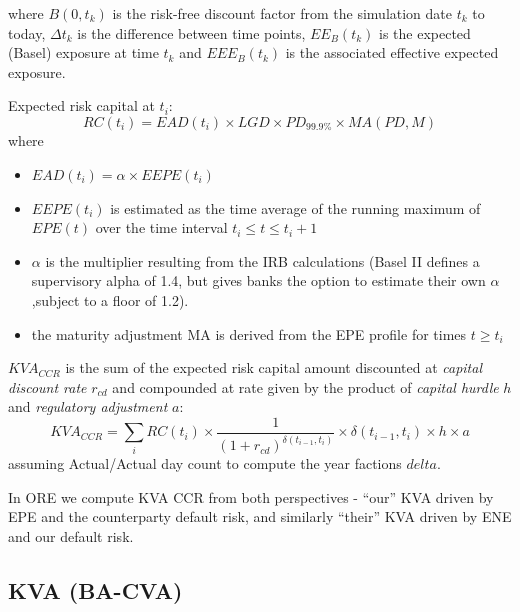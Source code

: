 \documentclass[12pt, a4paper]{article}
\newcommand{\KVA}{\mathit{KVA}}
\newcommand{\EE}{\mathit{EE}}
\newcommand{\EPE}{\mathit{EPE}}
\newcommand{\EEPE}{\mathit{EEPE}}
\newcommand{\EEE}{\mathit{EEE}}
\newcommand{\EAD}{\mathit{EAD}}
\newcommand{\RC}{\mathit{RC}}
\newcommand{\PD}{\mathit{PD}}
\newcommand{\MA}{\mathit{MA}}
\begin{document}
{{\begin{appendix}
\medskip where $B(0,t_k)$ is the risk-free discount factor from the
simulation  date $t_k$ to today, $\Delta t_k$ is the difference
between time points, 
$\EE_B(t_k)$ is the expected (Basel) exposure at time $t_k$ and $\EEE_B(t_k)$ is the
associated effective expected exposure.

\medskip 
Expected risk capital at $t_i$:
$$
\RC(t_i) = EAD(t_i) \times LGD \times \PD_{99.9\%} \times \MA(\PD, M)
$$
where
\begin{itemize}
\item $\EAD(t_i) = \alpha \times \EEPE(t_i)$
\item $\EEPE(t_i)$ is estimated as the time average of the running maximum of $\EPE(t)$ over the time interval $t_i\leq t\leq t_i+1$
\item $\alpha$ is the multiplier resulting from the IRB calculations (Basel II defines a supervisory alpha of 1.4, but gives banks the option to estimate their own $\alpha$,subject to a floor of 1.2).
\item the maturity adjustment MA is derived from the EPE profile for times $t\geq t_i$
\end{itemize}

\medskip 
$\KVA_{CCR}$ is the sum of the expected risk capital amount discounted at {\em capital discount rate} $r_{cd}$ and compounded at rate given by the product of {\em capital hurdle} $h$ and {\em regulatory adjustment} $a$:
$$
\KVA_{CCR} = \sum_i \RC(t_i) \times \frac{1}{ (1 + r_{cd})^{\delta(t_{i-1}, t_i)}} \times \delta(t_{i-1}, t_i) \times h \times a
$$
assuming Actual/Actual day count to compute the year factions $delta$.

In ORE we compute KVA CCR from both perspectives - ``our'' KVA driven by EPE and the counterparty default risk, and similarly ``their'' KVA driven by ENE and our default risk.

\subsection{KVA (BA-CVA)}\label{sec:app_kva_cva}


\end{appendix}}}
\end{document}
